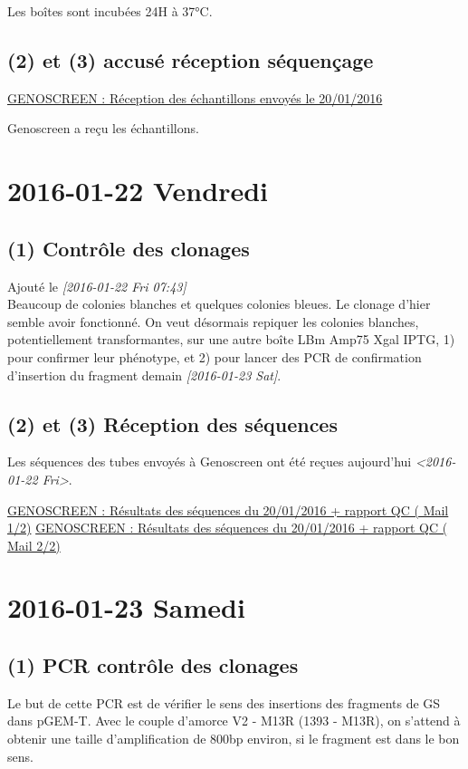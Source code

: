 \documentclass[9pt, oneside, twocolumn]{scrartcl}
\begin{document}
Les boîtes sont incubées 24H à 37°C. 

\subsection{(2) et (3) accusé réception séquençage}
\label{sec:orgheadline72}
\href{msgid:001501d1542e$943783b0$bca68b10$@genoscreen.fr}{GENOSCREEN : Réception des échantillons envoyés le 20/01/2016}

Genoscreen a reçu les échantillons. 

\section{2016-01-22 Vendredi}
\label{sec:orgheadline76}
\subsection{(1) Contrôle des clonages}
\label{sec:orgheadline74}
Ajouté le \textit{[2016-01-22 Fri 07:43] } \\
Beaucoup de colonies blanches et quelques colonies bleues. Le clonage d'hier
semble avoir fonctionné. On veut désormais repiquer les colonies blanches,
potentiellement transformantes, sur une autre boîte LBm Amp75 Xgal IPTG, 1) pour
confirmer leur phénotype, et 2) pour lancer des PCR de confirmation d'insertion
du fragment demain \textit{[2016-01-23 Sat]}. 

\subsection{(2) et (3) Réception des séquences}
\label{sec:orgheadline75}
Les séquences des tubes envoyés à Genoscreen ont été reçues aujourd'hui
\textit{<2016-01-22 Fri>}. 

\href{msgid:008901d15517$8e3c72b0$aab55810$@genoscreen.fr}{GENOSCREEN : Résultats des séquences du 20/01/2016 + rapport QC ( Mail 1/2)}
\href{msgid:008f01d15517$9b813500$d2839f00$@genoscreen.fr}{GENOSCREEN : Résultats des séquences du 20/01/2016 + rapport QC ( Mail 2/2)}
\section{2016-01-23 Samedi}
\label{sec:orgheadline81}
\subsection{(1) PCR contrôle des clonages}
\label{sec:orgheadline80}
Le but de cette PCR est de vérifier le sens des insertions des fragments de GS
dans pGEM-T. Avec le couple d'amorce V2 - M13R (1393 - M13R), on s'attend à
obtenir une taille d'amplification de 800bp environ, si le fragment est dans le
bon sens.
\end{document}
